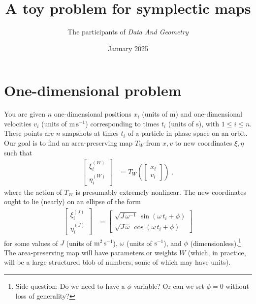 \documentclass{article}
\title{\bfseries%
A toy problem for symplectic maps}
\author{The participants of \textsl{Data And Geometry}}
\date{January 2025}
\newcommand{\unit}[1]{\mathrm{#1}}
\newcommand{\m}{\unit{m}}
\newcommand{\s}{\unit{s}}
\newcommand{\ps}{\s^{-1}}
\newcommand{\mps}{\m\,\ps}
\newcommand{\mmps}{\m^2\,\ps}
\begin{document}
\maketitle

\section{One-dimensional problem}
You are given $n$ one-dimensional positions $x_i$ (units of $\m$) and one-dimensional velocities $v_i$ (units of $\mps$) corresponding to times $t_i$ (units of $\s$), with $1\leq i\leq n$.
These points are $n$ snapshots at times $t_i$ of a particle in phase space on an orbit.
Our goal is to find an area-preserving map $T_W$ from $x, v$ to new coordinates $\xi, \eta$ such that
\begin{align}
    \begin{bmatrix}\xi^{(W)}_i \\ \eta^{(W)}_i\end{bmatrix} &= T_W(\begin{bmatrix}x_i \\ v_i\end{bmatrix}) ~,
\end{align}
where the action of $T_W$ is presumably extremely nonlinear.
The new coordinates ought to lie (nearly) on an ellipse of the form
\begin{align}
    \begin{bmatrix}\xi^{(J)}_i \\ \eta^{(J)}_i\end{bmatrix} &= \begin{bmatrix}\sqrt{J\,\omega^{-1}}\,\sin(\omega\,t_i+\phi) \\ \sqrt{J\,\omega}\,\cos(\omega\,t_i+\phi)\end{bmatrix}
\end{align}
for some values of $J$ (units of $\mmps$), $\omega$ (units of $\ps$), and $\phi$ (dimensionless).\footnote{Side question: Do we need to have a $\phi$ variable? Or can we set $\phi=0$ without loss of generality?}
The area-preserving map will have parameters or weights $W$ (which, in practice, will be a large structured blob of numbers, some of which may have units).
\end{document}
